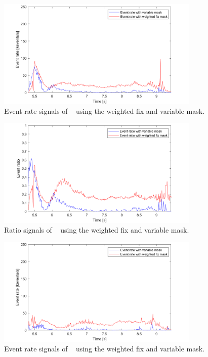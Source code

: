 \begin{figure}[H]
    \centering
    \includegraphics[width=0.86\textwidth]{resources/images/var_mask_hb1_slip_evr}
    \caption{Event rate signals of ~ using the weighted fix and variable mask.}\label{fig:var_mask_hb1_slip_evr}
\end{figure}

\begin{figure}[H]
    \centering
    \includegraphics[width=0.86\textwidth]{resources/images/var_mask_hb1_slip_rat}
    \caption{Ratio signals of ~ using the weighted fix and variable mask.}\label{fig:var_mask_hb1_slip_rat}
\end{figure}

\begin{figure}[H]
    \centering
    \includegraphics[width=0.86\textwidth]{resources/images/var_mask_hb2_no_slip_evr}
    \caption{Event rate signals of ~ using the weighted fix and variable mask.}\label{fig:var_mask_hb2_no_slip_evr}
\end{figure}

